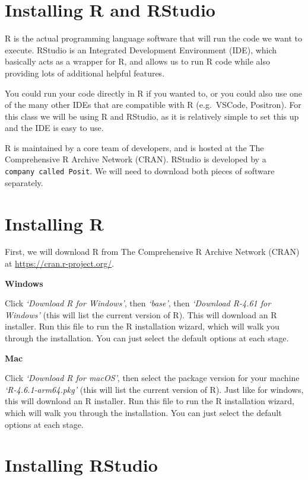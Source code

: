 \documentclass[
  letterpaper,
  DIV=11,
  numbers=noendperiod]{scrreprt}
\begin{document}
\chapter{Installing R and RStudio}\label{installing-r-and-rstudio}

R is the actual programming language software that will run the code we
want to execute. RStudio is an Integrated Development Environment (IDE),
which basically acts as a wrapper for R, and allows us to run R code
while also providing lots of additional helpful features.

You could run your code directly in R if you wanted to, or you could
also use one of the many other IDEs that are compatible with R
(e.g.~VSCode, Positron). For this class we will be using R and RStudio,
as it is relatively simple to set this up and the IDE is easy to use.

R is maintained by a core team of developers, and is hosted at the The
Comprehensive R Archive Network (CRAN). RStudio is developed by a
\texttt{company\ called\ Posit}. We will need to download both pieces of
software separately.

\chapter{Installing R}\label{installing-r}

First, we will download R from The Comprehensive R Archive Network
(CRAN) at \url{https://cran.r-project.org/}.

\textbf{Windows}

Click \emph{`Download R for Windows'}, then \emph{`base'}, then
\emph{`Download R-4.61 for Windows'} (this will list the current version
of R). This will download an R installer. Run this file to run the R
installation wizard, which will walk you through the installation. You
can just select the default options at each stage.

\textbf{Mac}

Click \emph{`Download R for macOS'}, then select the package version for
your machine \emph{`R-4.6.1-arm64.pkg'} (this will list the current
version of R). Just like for windows, this will download an R installer.
Run this file to run the R installation wizard, which will walk you
through the installation. You can just select the default options at
each stage.

\chapter{Installing RStudio}\label{installing-rstudio}
\end{document}

